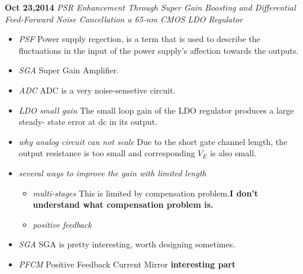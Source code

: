 \documentclass[]{article}
\begin{document}
\noindent \textbf{Oct 23,2014}
\textit{PSR Enhancement Through Super Gain Boosting and Differential Feed-Forward Noise Cancellation
        a 65-nm CMOS LDO Regulator}
\indent		\begin{itemize}
                \item \textit{PSF} Power supply regection, is a term that is used to describe the fluctuations
                        in the input of the power supply's affection towards the outputs. 
                \item \textit{SGA} Super Gain Amplifier.
                \item \textit{ADC} ADC is a very noise-sensetive circuit.
                \item \textit{LDO small gain} The small loop gain of the LDO regulator produces a large steady-
                        state error at dc in its output.
                \item \textit{why analog circuit can not scale} Due to the short gate channel length, the output
                        resistance is too small and corresponding $V_{E}$ is also small.
                \item \textit{several ways to improve the gain with limited length} 
                        \begin{itemize}
                            \item \textit{multi-stages} This is limited by compensation problem.\textbf{I don't 
                                understand what compensation problem is. }
                            \item \textit{positive feedback}
                        \end{itemize}
                \item \textit{SGA} SGA is pretty interesting, worth designing sometimes.
                \item \textit{PFCM} Positive Feedback Current Mirror \textbf{interesting part}
            \end{itemize}
\end{document}
